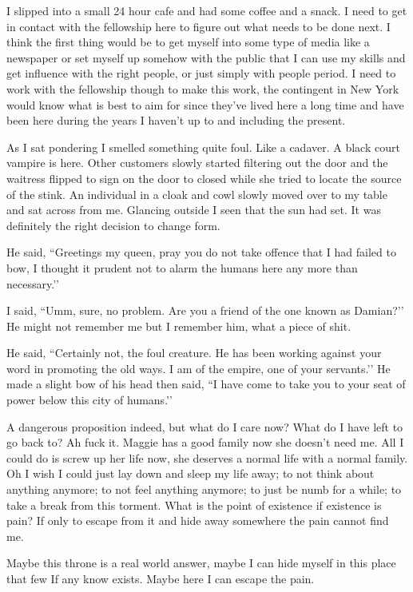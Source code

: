 I slipped into a small 24 hour cafe and had some coffee and a snack. I need to get in contact with the fellowship here to figure out what needs to be done next. I think the first thing would be to get myself into some type of media like a newspaper or set myself up somehow with the public that I can use my skills and get influence with the right people, or just simply with people period. I need to work with the fellowship though to make this work, the contingent in New York would know what is best to aim for since they’ve lived here a long time and have been here during the years I haven’t up to and including the present.

As I sat pondering I smelled something quite foul. Like a cadaver. A black court vampire is here. Other customers slowly started filtering out the door and the waitress flipped to sign on the door to closed while she tried to locate the source of the stink. An individual in a cloak and cowl slowly moved over to my table and sat across from me. Glancing outside I seen that the sun had set. It was definitely the right decision to change form.

He said, ``Greetings my queen, pray you do not take offence that I had failed to bow, I thought it prudent not to alarm the humans here any more than necessary.’’

I said, ``Umm, sure, no problem. Are you a friend of the one known as Damian?’’ He might not remember me but I remember him, what a piece of shit.

He said, ``Certainly not, the foul creature. He has been working against your word in promoting the old ways. I am of the empire, one of your servants.’’ He made a slight bow of his head then said, ``I have come to take you to your seat of power below this city of humans.’’

A dangerous proposition indeed, but what do I care now? What do I have left to go back to? Ah fuck it. Maggie has a good family now she doesn't need me. All I could do is screw up her life now, she deserves a normal life with a normal family. Oh I wish I could just lay down and sleep my life away; to not think about anything anymore; to not feel anything anymore; to just be numb for a while; to take a break from this torment. What is the point of existence if existence is pain? If only to escape from it and hide away somewhere the pain cannot find me.

Maybe this throne is a real world answer, maybe I can hide myself in this place that few If any know exists. Maybe here I can escape the pain.

